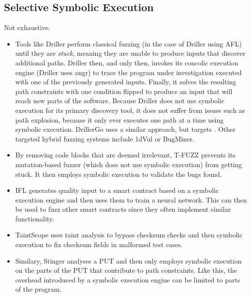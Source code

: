\documentclass{article}
\begin{document}
\begin{multicols}{2}
    \subsection{Selective Symbolic Execution}
    Not exhaustive.
    \begin{itemize}
        \item Tools like Driller\cite{Driller} perform classical fuzzing (in the case of Driller using AFL\cite{AFLPlusPlus}) until they are \textit{stuck}, meaning they are unable to produce inputs that discover additional paths. Driller then, and only then, invokes its concolic execution engine (Driller uses angr\cite{angr}) to trace the program under investigation executed with one of the previously generated inputs. Finally, it solves the resulting path constraints with one condition flipped to produce an input that will reach new parts of the software. Because Driller does not use symbolic execution for its primary discovery tool, it does not suffer from issues such as path explosion, because it only ever executes one path at a time using symbolic execution. DrillerGo\cite{DrillerGo} uses a similar approach, but targets \cite{DrillerGo}. Other targeted hybrid fuzzing systems include 1dVul\cite{1dVul} or BugMiner\cite{BugMiner}.
        \item By removing code blocks that are deemed irrelevant, T-FUZZ\cite{TFuzz} prevents its mutation-based fuzzer (which does not use symbolic execution) from getting stuck. It then employs symbolic execution to validate the bugs found.
        \item IFL\cite{IFL} generates quality input to a smart contract based on a symbolic execution engine and then uses them to train a neural network. This can then be used to fuzz other smart contracts since they often implement similar functionality.
        \item TaintScope\cite{TaintScope} uses taint analysis to bypass checksum checks and then symbolic execution to fix checksum fields in malformed test cases.
        \item Similary, Stinger\cite{Stinger} analyses a PUT and then only employs symbolic execution on the parts of the PUT that contribute to path constraints. Like this, the overhead introduced by a symbolic execution engine can be limited to parts of the program.
    \end{itemize}


\end{multicols}
\end{document}
